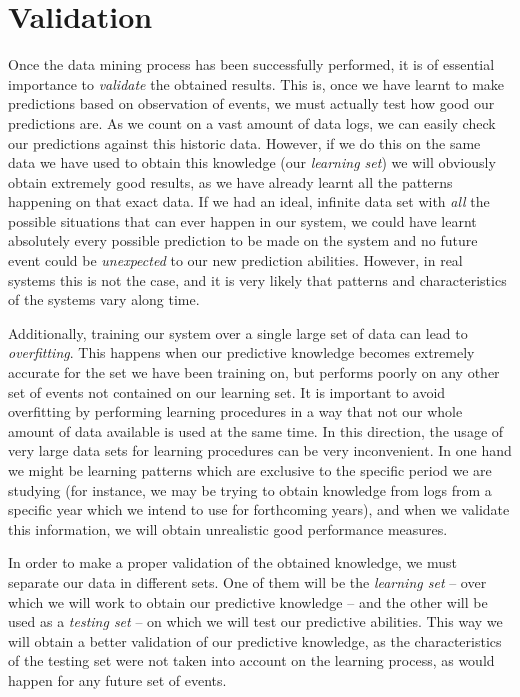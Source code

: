 \documentclass[a4paper,12pt]{article}
\begin{document}
\section{Validation}
Once the data mining process has been successfully performed, it is of essential importance to \emph{validate} the obtained results. This is, once we have learnt to make predictions based on observation of events, we must actually test how good our predictions are. As we count on a vast amount of data logs, we can easily check our predictions against this historic data. However, if we do this on the same data we have used to obtain this knowledge (our \emph{learning set}) we will obviously obtain extremely good results, as we have already learnt all the patterns happening on that exact data. If we had an ideal, infinite data set with \emph{all} the possible situations that can ever happen in our system, we could have learnt absolutely every possible prediction to be made on the system and no future event could be \emph{unexpected} to our new prediction abilities. However, in real systems this is not the case, and it is very likely that patterns and characteristics of the systems vary along time. 

Additionally, training our system over a single large set of data can lead to \emph{overfitting}. This happens when our predictive knowledge becomes extremely accurate for the set we have been training on, but performs poorly on any other set of events not contained on our learning set. It is important to avoid overfitting by performing learning procedures in a way that not our whole amount of data available is used at the same time. In this direction, the usage of very large data sets for learning procedures can be very inconvenient. In one hand we might be learning patterns which are exclusive to the specific period we are studying (for instance, we may be trying to obtain knowledge from logs from a specific year which we intend to use for forthcoming years), and when we validate this information, we will obtain unrealistic good performance measures.

In order to make a proper validation of the obtained knowledge, we must separate our data in different sets. One of them will be the \emph{learning set} -- over which we will work to obtain our predictive knowledge -- and the other will be used as a \emph{testing set} -- on which we will test our predictive abilities. This way we will obtain a better validation of our predictive knowledge, as the characteristics of the testing set were not taken into account on the learning process, as  would happen for any future set of events.
\end{document}
